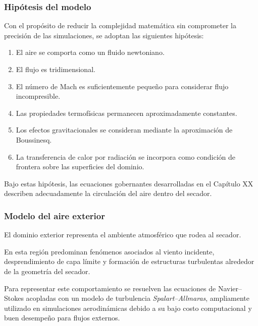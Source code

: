 \subsubsection{Hipótesis del modelo}

Con el propósito de reducir la complejidad matemática sin comprometer la precisión de las simulaciones, se adoptan las siguientes hipótesis:

\begin{enumerate}

\item El aire se comporta como un fluido newtoniano.

\item El flujo es tridimensional.

\item El número de Mach es suficientemente pequeño para considerar flujo incompresible.

\item Las propiedades termofísicas permanecen aproximadamente constantes.

\item Los efectos gravitacionales se consideran mediante la aproximación de Boussinesq.

\item La transferencia de calor por radiación se incorpora como condición de frontera sobre las superficies del dominio.

\end{enumerate}

Bajo estas hipótesis, las ecuaciones gobernantes desarrolladas en el Capítulo XX describen adecuadamente la circulación del aire dentro del secador.

\subsubsection{Modelo del aire exterior}

El dominio exterior representa el ambiente atmosférico que rodea al secador.

En esta región predominan fenómenos asociados al viento incidente, desprendimiento de capa límite y formación de estructuras turbulentas alrededor de la geometría del secador.

Para representar este comportamiento se resuelven las ecuaciones de Navier--Stokes acopladas con un modelo de turbulencia \textit{Spalart--Allmaras}, ampliamente utilizado en simulaciones aerodinámicas debido a su bajo costo computacional y buen desempeño para flujos externos.

